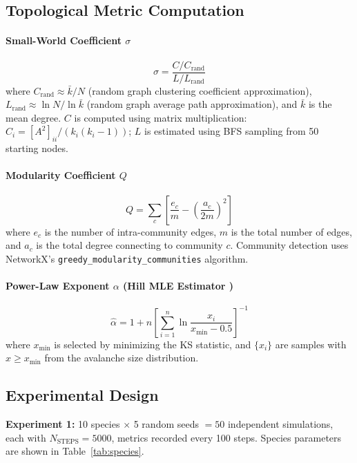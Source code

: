 \documentclass[12pt,a4paper]{article}
\begin{document}
\subsection{Topological Metric Computation}

\paragraph{Small-World Coefficient $\sigma$}
\begin{equation}
\sigma = \frac{C/C_{\text{rand}}}{L/L_{\text{rand}}}
\label{eq:sigma}
\end{equation}
where $C_{\text{rand}} \approx \bar{k}/N$ (random graph clustering coefficient approximation), $L_{\text{rand}} \approx \ln N / \ln \bar{k}$ (random graph average path approximation), and $\bar{k}$ is the mean degree. $C$ is computed using matrix multiplication: $C_i = [A^2]_{ii} / (k_i(k_i-1))$; $L$ is estimated using BFS sampling from 50 starting nodes.

\paragraph{Modularity Coefficient $Q$ \citep{newman2006}}
\begin{equation}
Q = \sum_c \left[ \frac{e_c}{m} - \left(\frac{a_c}{2m}\right)^2 \right]
\label{eq:modularity}
\end{equation}
where $e_c$ is the number of intra-community edges, $m$ is the total number of edges, and $a_c$ is the total degree connecting to community $c$. Community detection uses NetworkX's \texttt{greedy\_modularity\_communities} algorithm.

\paragraph{Power-Law Exponent $\alpha$ (Hill MLE Estimator \citep{clauset2009})}
\begin{equation}
\hat{\alpha} = 1 + n \left[\sum_{i=1}^{n} \ln \frac{x_i}{x_{\min} - 0.5}\right]^{-1}
\label{eq:hill_mle}
\end{equation}
where $x_{\min}$ is selected by minimizing the KS statistic, and $\{x_i\}$ are samples with $x \geq x_{\min}$ from the avalanche size distribution.

\subsection{Experimental Design}
\textbf{Experiment 1:} 10 species $\times$ 5 random seeds $= 50$ independent simulations, each with $N_{\text{STEPS}}=5000$, metrics recorded every 100 steps. Species parameters are shown in Table~\ref{tab:species}.
\end{document}
